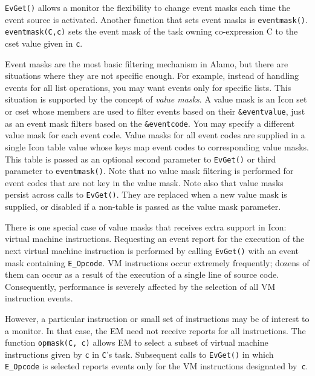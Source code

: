 
\vspace{0.25pc}
\noindent
{\tt EvGet()} allows a monitor the flexibility to change event masks each
time the event source is activated.  Another function that sets event masks
is {\tt eventmask()}.  {\tt eventmask(C,c)} sets the event mask of the task
owning co-expression C to the cset value given in {\tt c}.

Event masks are the most basic filtering mechanism in Alamo, but there are
situations where they are not specific enough.  For example, instead of
handling events for all list operations, you may want events only for
specific lists.  This situation is supported by the concept of {\em value
masks}.  A value mask is an Icon set or cset whose members are used to
filter events based on their {\tt \&eventvalue}, just as an event mask
filters based on the {\tt \&eventcode}.  You may specify a different value
mask for each event code.  Value masks for all event codes are supplied in a
single Icon table value whose keys map event codes to corresponding value
masks.  This table is passed as an optional second parameter to {\tt EvGet()}
or third parameter to {\tt eventmask()}.  Note that no value mask filtering
is performed for event codes that are not key in the value mask.  Note also
that value masks persist across calls to {\tt EvGet()}. They are replaced
when a new value mask is supplied, or disabled if a non-table is
passed as the value mask parameter.

There is one special case of value masks that receives extra support in
Icon: virtual machine instructions.
Requesting an event report for the execution of the next virtual
machine instruction is performed by calling {\tt EvGet()} with an event
mask containing {\tt E\_Opcode}.  VM instructions occur
extremely frequently; dozens of them can occur as a result of the
execution of a single line of source code.  Consequently, performance
is severely affected by the selection of all VM instruction events.

However, a particular instruction or small set of instructions
may be of interest to a monitor.  In that case, the EM need not
receive reports for all instructions.  The function {\tt opmask(C, c)}
allows EM to select a subset of virtual machine instructions given by
{\tt c} in {\tt C}'s task.  Subsequent calls to {\tt EvGet()} in
which {\tt E\_Opcode} is selected reports events only for the VM
instructions designated by~{\tt c}.

